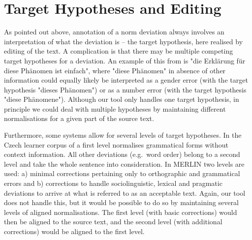 \documentclass[10pt, a4paper]{article}
\newcommand{\dan}[1]{{\color{Fuchsia}{Dan: #1}}}
\newcommand{\elena}[1]{{\color{BrickRed}{Elena: #1}}}
\newcommand{\mats}[1]{{\color{Blue}{Mats: #1}}}
\newcommand{\normAnn}[0]{our tool }
\begin{document}
\section{Target Hypotheses and Editing}
\label{sec:targethypothesis}





As pointed out above, annotation of a norm deviation always involves an interpretation of what the deviation is -- the target hypothesis, here realised by editing of the text. A complication is that there may be multiple competing target hypotheses for a deviation. An example of this from  is "die Erklärung für diese Phänomen ist einfach", where "diese Ph{\"a}nomen" in absence of other information could equally likely be interpreted as a gender error (with the target hypothesis "dieses Ph{\"a}nomen") or as a number error (with the target hypothesis "diese Ph{\"a}nomene"). Although \normAnn only handles one target hypothesis, in principle we could deal with multiple hypotheses by maintaining different normalisations for a given part of the source text.

Furthermore, some systems allow for several levels of target hypotheses. In the Czech learner corpus of  a first level normalises grammatical forms without context information. All other deviations (e.g.\ word order) belong to a second level and take the whole sentence into consideration.
In MERLIN \cite{MERLIN2014} two levels are used: a) minimal corrections pertaining only to orthographic and grammatical errors and b) corrections to handle sociolinguistic, lexical and pragmatic deviations to arrive at what is referred to as an acceptable text. Again, \normAnn does not handle this, but it would be possible to do so by maintaining several levels of aligned normalisations. The first level (with basic corrections) would then be aligned to the source text, and the second level (with additional corrections) would be aligned to the first level.
\end{document}
